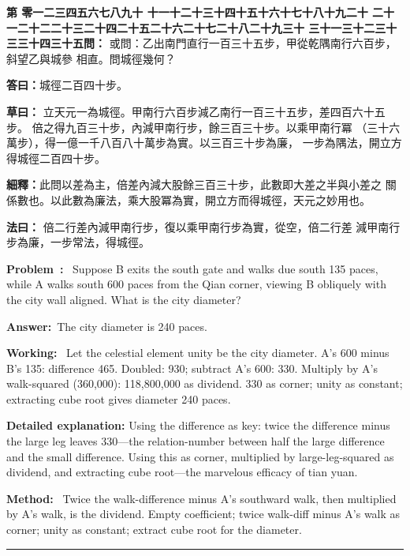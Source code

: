 \documentclass[9pt,a4paper]{article}
\newcounter{probnum}
\newcounter{overallnum}
\newcommand{\chnum}[1]{%
  \ifcase#1 零\or 一\or 二\or 三\or 四\or 五\or 六\or 七\or 八\or 九\or 十\or
    十一\or 十二\or 十三\or 十四\or 十五\or 十六\or 十七\or 十八\or 十九\or 二十\or
    二十一\or 二十二\or 二十三\or 二十四\or 二十五\or 二十六\or 二十七\or 二十八\or 二十九\or 三十\or
    三十一\or 三十二\or 三十三\or 三十四\or 三十五\fi}
\newcommand{\problem}[1]{\stepcounter{probnum}\stepcounter{overallnum}\par\noindent\textbf{\color{volcolor}第\chnum{\value{probnum}}問：}#1\par\vspace{0.15cm}}
\newcommand{\answer}[1]{\par\noindent\textbf{答曰：}#1\par\vspace{0.15cm}}
\newcommand{\working}[1]{\par\noindent\textbf{草曰：}#1\par\vspace{0.15cm}}
\newcommand{\method}[1]{\par\noindent\textbf{法曰：}#1\par\vspace{0.25cm}}
\newcommand{\eproblem}[1]{\par\noindent\textbf{\color{volcolor}Problem~\theoverallnum:}~#1\par\vspace{0.15cm}}
\newcommand{\eanswer}[1]{\par\noindent\textbf{Answer:}~#1\par\vspace{0.15cm}}
\newcommand{\eworking}[1]{\par\noindent\textbf{Working:}~#1\par\vspace{0.15cm}}
\newcommand{\emethod}[1]{\par\noindent\textbf{Method:}~#1\par\vspace{0.25cm}}
\begin{document}
\noindent\begin{minipage}[t]{0.48\textwidth}
\problem{
或問：乙出南門直行一百三十五步，甲從乾隅南行六百步，斜望乙與城參
相直。問城徑幾何？
}

\answer{城徑二百四十步。}

\working{
立天元一為城徑。甲南行六百步減乙南行一百三十五步，差四百六十五步。
倍之得九百三十步，內減甲南行步，餘三百三十步。以乘甲南行冪
（三十六萬步），得一億一千八百八十萬步為實。以三百三十步為廉，
一步為隅法，開立方得城徑二百四十步。

\textbf{細釋：}此問以差為主，倍差內減大股餘三百三十步，此數即大差之半與小差之
關係數也。以此數為廉法，乘大股冪為實，開立方而得城徑，天元之妙用也。
}

\method{
倍二行差內減甲南行步，復以乘甲南行步為實，從空，倍二行差
減甲南行步為廉，一步常法，得城徑。
}
\end{minipage}%
\hfill%
\begin{minipage}[t]{0.50\textwidth}
\eproblem{
Suppose B exits the south gate and walks due south 135 paces, while A walks
south 600 paces from the Qian corner, viewing B obliquely with the city wall
aligned. What is the city diameter?
}

\eanswer{The city diameter is 240 paces.}

\eworking{
Let the celestial element unity be the city diameter. A's 600 minus B's 135:
difference 465. Doubled: 930; subtract A's 600: 330. Multiply by A's walk-squared
(360,000): 118,800,000 as dividend. 330 as corner; unity as constant;
extracting cube root gives diameter 240 paces.

\textbf{Detailed explanation:} Using the difference as key: twice the difference
minus the large leg leaves 330---the relation-number between half the large
difference and the small difference. Using this as corner, multiplied by
large-leg-squared as dividend, and extracting cube root---the marvelous
efficacy of tian yuan.
}

\emethod{
Twice the walk-difference minus A's southward walk, then multiplied by A's
walk, is the dividend. Empty coefficient; twice walk-diff minus A's walk as
corner; unity as constant; extract cube root for the diameter.
}
\end{minipage}
\vspace{0.15cm}

\vspace{0.15cm}
\noindent\rule{\textwidth}{0.2pt}
\vspace{0.15cm}
\end{document}
